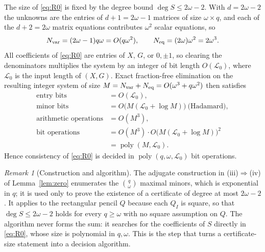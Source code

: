 \documentclass[journal]{IEEEtran}
\theoremstyle{plainn}
\theoremstyle{remark}
\newtheorem{remark}{Remark}
\begin{document}
The size of \eqref{eq:R0} is fixed by the degree bound $\deg S\le2\omega-2$.
With $d=2\omega-2$ the unknowns are the entries of $d+1=2\omega-1$ matrices of
size $\omega\times q$, and each of the $d+2=2\omega$ matrix equations contributes
$\omega^2$ scalar equations, so
\begin{equation*}
N_{\rm var}=(2\omega-1)q\omega=O(q\omega^2),\qquad
N_{\rm eq}=(2\omega)\omega^2=2\omega^3 .
\end{equation*}
All coefficients of \eqref{eq:R0} are entries of $X$, $G$, or $0,\pm1$, so
clearing the denominators multiplies the system by an integer of bit length
$O(\mathcal L_0)$, where $\mathcal L_0$ is the input length of $(X,G)$. Exact
fraction-free elimination on the resulting integer system of size
$M=N_{\rm var}+N_{\rm eq}=O(\omega^3+q\omega^2)$ then satisfies
\begin{equation*}
\begin{aligned}
\text{entry bits}&=O(\mathcal L_0),\\
\text{minor bits}&=O\bigl(M(\mathcal L_0+\log M)\bigr)\ \text{(Hadamard)},\\
\text{arithmetic operations}&=O(M^3),\\
\text{bit operations}&=O(M^3)\cdot O\bigl(M(\mathcal L_0+\log M)\bigr)^2\\
&=\operatorname{poly}(M,\mathcal L_0).
\end{aligned}
\end{equation*}
Hence consistency of \eqref{eq:R0} is decided in
$\operatorname{poly}(q,\omega,\mathcal L_0)$ bit operations.

\begin{remark}[Construction and algorithm]\label{rem:construction}
The adjugate construction in (iii)$\Rightarrow$(iv) of Lemma~\ref{lem:zero}
enumerates the $\binom q\omega$ maximal minors, which is exponential in $q$; it
is used only to prove the existence of a certificate of degree at most
$2\omega-2$. It applies to the rectangular pencil $Q$ because each $Q_I$ is
square, so that $\deg S\le2\omega-2$ holds for every $q\ge\omega$ with no square
assumption on $Q$. The algorithm never forms the sum: it searches for the
coefficients of $S$ directly in \eqref{eq:R0}, whose size is polynomial in
$q,\omega$. This is the step that turns a certificate-size statement into a
decision algorithm.
\end{remark}
\end{document}

